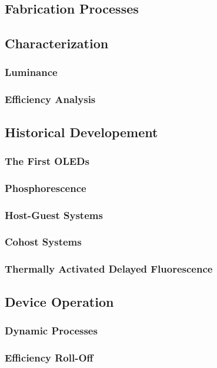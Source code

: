 \documentclass[../thesis.tex]{subfiles}
\begin{document}
\subsection{Fabrication Processes}

\subsection{Characterization}
\subsubsection{Luminance}
\subsubsection{Efficiency Analysis}

\subsection{Historical Developement}
\subsubsection{The First OLEDs}
\subsubsection{Phosphorescence}
\subsubsection{Host-Guest Systems}
\subsubsection{Cohost Systems}
\subsubsection{Thermally Activated Delayed Fluorescence}

\subsection{Device Operation}
\subsubsection{Dynamic Processes}
\subsubsection{Efficiency Roll-Off}




\end{document}
